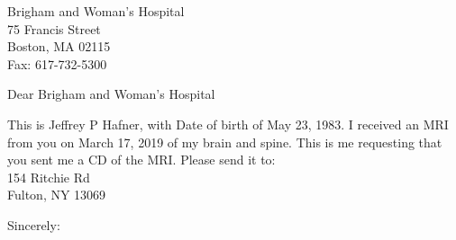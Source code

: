 \documentclass[
    jphafner,
    DIV=14,
]{scrlttr2}
\date{\today}
\begin{document}
\begin{letter}{Brigham and Woman's Hospital \\
    75 Francis Street \\
    Boston, MA 02115 \\
    Fax: 617-732-5300 }


\opening{Dear Brigham and Woman's Hospital}

This is Jeffrey P Hafner, with Date of birth of May 23, 1983.
I received an MRI from you on March 17, 2019 of my brain and spine.
This is me requesting that you sent me a CD of the MRI.
Please send it to:
\\

154 Ritchie Rd \\
Fulton, NY 13069


\closing{Sincerely:}
\end{letter}
\end{document}
